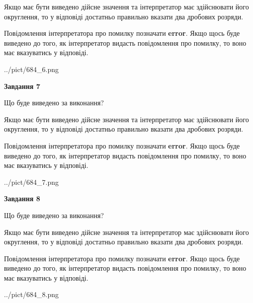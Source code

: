 \documentclass[12pt, ukrainian]{article}
\begin{document}
{\begin {Large}
Якщо має бути виведено дійсне значення та інтерпретатор має здійснювати його округлення, 
то у відповіді достатньо правильно вказати два дробових розряди.

Повідомлення інтерпретатора про помилку позначати \textbf{error}.
Якщо щось буде виведено до того, як інтерпретатор видасть повідомлення про помилку, 
то воно має вказуватись у відповіді. \par

\begin{center}
	{../pict/684_6.png}
\end{center}
\newpage

{\begin {center}\textbf{Завдання 7}\end {center}}\par
Що буде виведено за виконання? \par

Якщо має бути виведено дійсне значення та інтерпретатор має здійснювати його округлення, 
то у відповіді достатньо правильно вказати два дробових розряди.

Повідомлення інтерпретатора про помилку позначати \textbf{error}.
Якщо щось буде виведено до того, як інтерпретатор видасть повідомлення про помилку, 
то воно має вказуватись у відповіді. \par

\begin{center}
	{../pict/684_7.png}
\end{center}
\newpage

{\begin {center}\textbf{Завдання 8}\end {center}}\par
Що буде виведено за виконання? \par

Якщо має бути виведено дійсне значення та інтерпретатор має здійснювати його округлення, 
то у відповіді достатньо правильно вказати два дробових розряди.

Повідомлення інтерпретатора про помилку позначати \textbf{error}.
Якщо щось буде виведено до того, як інтерпретатор видасть повідомлення про помилку, 
то воно має вказуватись у відповіді. \par

\begin{center}
	{../pict/684_8.png}
\end{center}
\newpage


\end{Large}}
\end{document}

